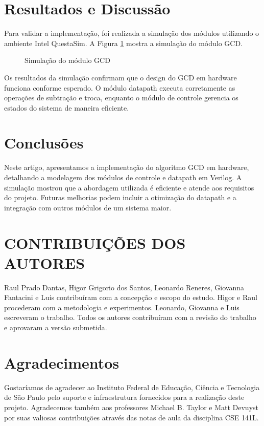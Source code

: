 \documentclass[a4paper,11pt]{article} %
\begin{document}
\section*{Resultados e Discussão}

Para validar a implementação, foi realizada a simulação dos módulos utilizando o ambiente Intel QuestaSim. A Figura \ref{fig:simulacao} mostra a simulação do módulo GCD.

\begin{figure}[ht]
\centering
\caption{Simulação do módulo GCD}
\label{fig:simulacao}
\end{figure}

Os resultados da simulação confirmam que o design do GCD em hardware funciona conforme esperado. O módulo datapath executa corretamente as operações de subtração e troca, enquanto o módulo de controle gerencia os estados do sistema de maneira eficiente.

\section*{Conclusões}

Neste artigo, apresentamos a implementação do algoritmo GCD em hardware, detalhando a modelagem dos módulos de controle e datapath em Verilog. A simulação mostrou que a abordagem utilizada é eficiente e atende aos requisitos do projeto. Futuras melhorias podem incluir a otimização do datapath e a integração com outros módulos de um sistema maior.

\section*{CONTRIBUIÇÕES DOS AUTORES}
Raul Prado Dantas, Higor Grigorio dos Santos, Leonardo Reneres, Giovanna Fantacini e Luis contribuíram com a concepção e escopo do estudo. Higor e Raul procederam com a metodologia e experimentos. Leonardo, Giovanna e Luis escreveram o trabalho. Todos os autores contribuíram com a revisão do trabalho e aprovaram a versão submetida.

\section*{Agradecimentos}

Gostaríamos de agradecer ao Instituto Federal de Educação, Ciência e Tecnologia de São Paulo pelo suporte e infraestrutura fornecidos para a realização deste projeto. Agradecemos também aos professores Michael B. Taylor e Matt Devuyst por suas valiosas contribuições através das notas de aula da disciplina CSE 141L.


\end{document}
